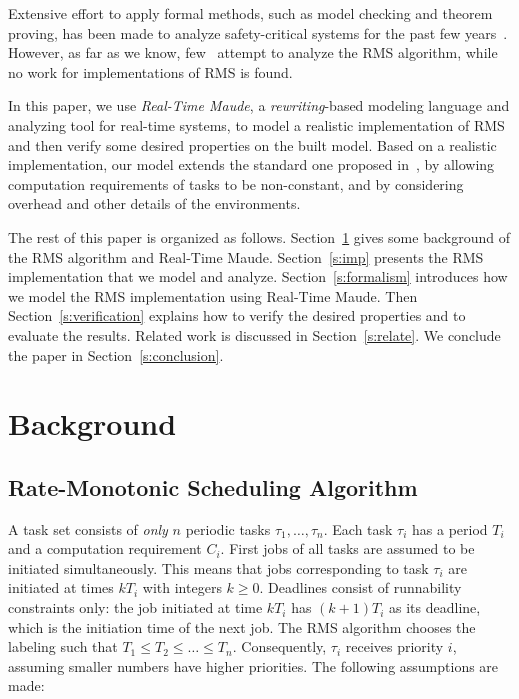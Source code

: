 \documentclass{llncs}
\begin{document}
Extensive effort to apply formal methods, such as model checking and
theorem proving, has been made to analyze safety-critical systems for
the past few
years~\cite{DBLP:journals/iandc/MeseguerR13,DBLP:journals/cacm/Leroy09,DBLP:conf/sosp/KleinEHACDEEKNSTW09}. However,
as far as we know, few~\cite{DBLP:conf/iceccs/CuiDT14,TianD2011}
attempt to analyze the RMS algorithm, while no work for
implementations of RMS is found.

In this paper, we use \emph{Real-Time Maude}, a \emph{rewriting}-based
modeling language and analyzing tool for real-time systems, to model a
realistic implementation of RMS and then verify some desired
properties on the built model. Based on a realistic implementation,
our model extends the standard one proposed
in~\cite{DBLP:journals/jacm/LiuL73}, by allowing computation
requirements of tasks to be non-constant, and by considering overhead
and other details of the environments.

The rest of this paper is organized as
follows. Section~\ref{s:background} gives some background of the RMS
algorithm and Real-Time Maude.  Section~\ref{s:imp} presents the RMS
implementation that we model and analyze.  Section~\ref{s:formalism}
introduces how we model the RMS implementation using Real-Time
Maude. Then Section~\ref{s:verification} explains how to verify the
desired properties and to evaluate the results. Related work is
discussed in Section~\ref{s:relate}. We conclude the paper in
Section~\ref{s:conclusion}.

\section{Background}
\label{s:background}

\subsection{Rate-Monotonic Scheduling Algorithm}
\label{ss:rms}
A task set consists of \emph{only} $n$ periodic tasks
$\tau_1,\ldots,\tau_n$. Each task $\tau_i$ has a period $T_i$ and a
computation requirement $C_i$. First jobs of all tasks are assumed to
be initiated simultaneously. This means that jobs corresponding to
task $\tau_i$ are initiated at times $kT_i$ with integers $k\ge
0$. Deadlines consist of runnability constraints only: the job
initiated at time $kT_i$ has $(k+1)T_i$ as its deadline, which is the
initiation time of the next job. The RMS algorithm chooses the
labeling such that $T_1\le T_2\le \ldots \le T_n$. Consequently,
$\tau_i$ receives priority $i$, assuming smaller numbers have higher
priorities. The following assumptions are made:
\end{document}
